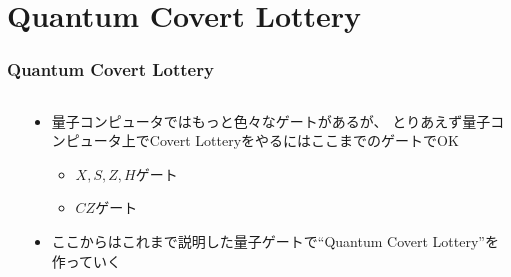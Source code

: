 \section{Quantum Covert Lottery}

\begin{frame}
  \frametitle{Quantum Covert Lottery}

  \begin{columns}
    \begin{column}{0.55\textwidth}
      \begin{minipage}[t][.6\textheight][t]{\textwidth}
        \tableofcontents[currentsection]
      \end{minipage}
    \end{column}
    \begin{column}{0.45\textwidth}
      \begin{itemize}
        \item 量子コンピュータではもっと色々なゲートがあるが、
        とりあえず量子コンピュータ上でCovert LotteryをやるにはここまでのゲートでOK
        \begin{itemize}
          \item $X, S, Z, H$ゲート
          \item $CZ$ゲート
        \end{itemize}
        
        \item ここからはこれまで説明した量子ゲートで``Quantum Covert Lottery''を作っていく
      \end{itemize}
    \end{column}
  \end{columns}
\end{frame}

\newcommand{\CovertTable}{%
  \begin{tabularx}{0.9\textwidth}{@{}| Y | Y |@{}}
    \hline
    希望 & 意味 \\ \hline
    $0$ & ボブの奢り \\ \hline
    $1$ & 割り勘 \\ \hline
  \end{tabularx}%
}

